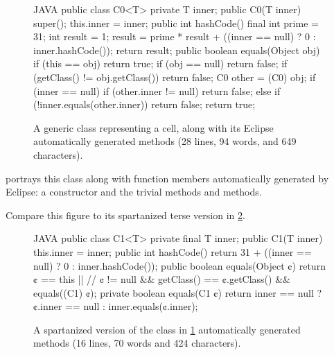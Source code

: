 \begin{figure}[H]
  \caption{A generic class representing a cell, along with its Eclipse
  automatically generated methods (28 lines, 94 words, and 649 characters).}
    \label{figure:cell0}
    \begin{adjustbox}{max width=\columnwidth}
\begin{code}[minipage, width=1.25\columnwidth]{JAVA}
public class C0<T> {
  private T inner;
  public C0(T inner) {
    super();
    this.inner = inner;
  }
  public int hashCode() {
    final int prime = 31;
    int result = 1;
    result = prime * result + ((inner == null) ? 0 : inner.hashCode());
    return result;
  }
  public boolean equals(Object obj) {
    if (this == obj)
      return true;
    if (obj == null)
      return false;
    if (getClass() != obj.getClass())
      return false;
    C0 other = (C0) obj;
    if (inner == null) {
      if (other.inner != null)
        return false;
    } else if (!inner.equals(other.inner))
      return false;
    return true;
  }
}
\end{code}
\end{adjustbox}
\end{figure}

 portrays this class along with function members
automatically generated by Eclipse: a constructor and the trivial methods
 and  methods.

Compare this figure to its spartanized terse version in \cref{figure:cell1}.

\begin{figure}[H]
  \caption{A spartanized version of the \Java class in \cref{figure:cell0}
    automatically generated methods (16 lines, 70 words and 424 characters).}
    \label{figure:cell1}
    \begin{adjustbox}{max width=\columnwidth}
\begin{code}[minipage, width=1.25\columnwidth]{JAVA}
public class C1<T> {
  private final T inner;
  public C1(T inner) {
    this.inner = inner;
  }
  public int hashCode() {
    return 31 + ((inner == null) ? 0 : inner.hashCode());
  }
  public boolean equals(Object ¢) {
    return ¢ == this || //
      ¢ != null && getClass() == ¢.getClass() && equals((C1) ¢);
  }
  private boolean equals(C1 ¢) {
    return inner == null ? ¢.inner == null : inner.equals(¢.inner);
  }
}
\end{code}
\end{adjustbox}
\end{figure}

